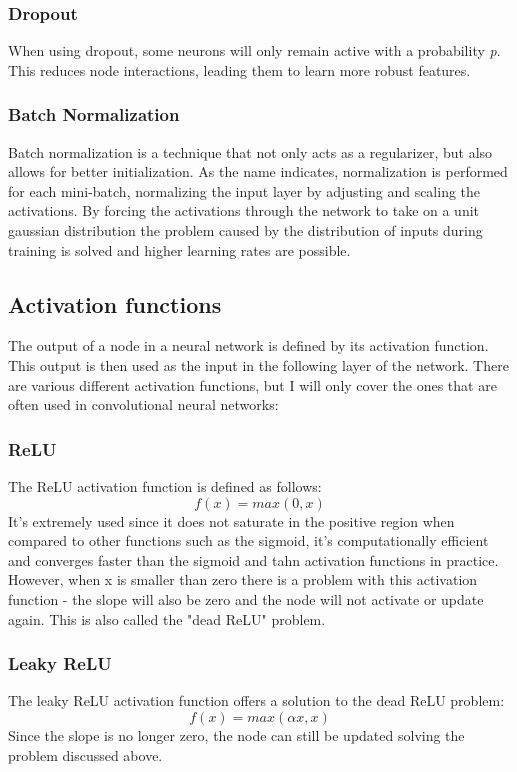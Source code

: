 \documentclass[10pt,a4paper]{article}
\begin{document}
\subsubsection{Dropout}
When using dropout, some neurons will only remain active with a probability \textit{p}. This reduces node interactions, leading them to learn more robust features.

\subsubsection{Batch Normalization}
Batch normalization\cite{ioffe2015batch} is a technique that not only acts as a regularizer, but also allows for better initialization. As the name indicates, normalization is performed for each mini-batch, normalizing the input layer by adjusting and scaling the activations. By forcing the activations through the network to take on a unit gaussian distribution the problem caused by the distribution of inputs during training is solved and higher learning rates are possible. 

\subsection{Activation functions}
The output of a node in a neural network is defined by its activation function. This output is then used as the input in the following layer of the network. There are various different activation functions, but I will only cover the  ones that are often used in convolutional neural networks:

\subsubsection{ReLU}
The ReLU activation function is defined as follows: $$f(x) = max(0, x)$$ It's extremely used since it does not saturate in the positive region when compared to other functions such as the sigmoid, it's computationally efficient and converges faster than the sigmoid and tahn activation functions in practice. However, when x is smaller than zero there is a problem with this activation function - the slope will also be zero and the node will not activate or update again. This is also called the "dead ReLU" problem.

\subsubsection{Leaky ReLU}
The leaky ReLU activation function offers a solution to the dead ReLU problem: $$f(x) = max (\alpha x, x)$$
Since the slope is no longer zero, the node can still be updated solving the problem discussed above.
\end{document}
